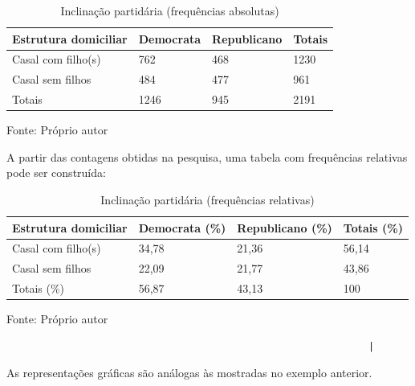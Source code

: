 \documentclass[
]{book}
\begin{document}
\hfill\break

\begin{table}[h]
\centering
\caption{Inclinação partidária (frequências absolutas)}
\begin{tabular}{|l|l|l|l|}
\hline
Estrutura domiciliar    & Democrata          & Republicano &  Totais        \\
\hline
Casal com filho(s)    & 762                & 468         & 1230            \\
Casal sem filhos      & 484                & 477         & 961             \\
\hline
Totais                & 1246               & 945         & 2191           \\
\hline
\end{tabular}
\vspace{4pt}
Fonte: Próprio autor                                                
\end{table} 

\hfill\break

A partir das contagens obtidas na pesquisa, uma tabela com frequências relativas pode ser construída:

\hfill\break

\begin{table}[h]
\centering
\caption{Inclinação partidária (frequências relativas)}
\begin{tabular}{|l|l|l|l|}
\hline
Estrutura domiciliar    & Democrata (\%)          & Republicano (\%) &  Totais  (\%)      \\
\hline
Casal com filho(s)    & 34,78                & 21,36         & 56,14            \\
Casal sem filhos      & 22,09                & 21,77         & 43,86             \\
\hline
Totais (\%)               & 56,87               & 43,13         & 100           \\
\hline
\end{tabular}
\vspace{4pt}
Fonte: Próprio autor                                                
\end{table} 

\begin{verbatim}
                                                               |
\end{verbatim}

As representações gráficas são análogas às mostradas no exemplo anterior.

\hfill\break
\end{document}
